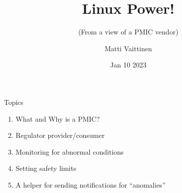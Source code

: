 \documentclass[10pt]{beamer}
\title{Linux Power!}
\subtitle{(From a view of a PMIC vendor)}
\author{Matti Vaittinen}
\institute{ROHM Semiconductors}
\date{Jan 10 2023}
\begin{document}
\begin{frame}
	\titlepage

\end{frame}


\begin{frame}{Topics}
	\begin{enumerate}
		\item What and Why is a PMIC?
		\item Regulator provider/consumer
		\item Monitoring for abnormal conditions
		\item Setting safety limits
		\item A helper for sending notifications for “anomalies”
	\end{enumerate}
\end{frame}

\end{document}
